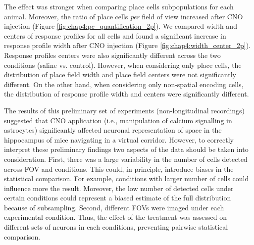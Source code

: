 The effect was stronger when comparing place cells subpopulations for each animal.
Moreover, the ratio of place cells \textit{per} field of view increased after CNO injection (Figure \ref{fig:chap4:pc_quantification_2p}). 
We compared width and centers of response profiles for all cells and found a significant increase in response profile width after CNO injection (Figure \ref{fig:chap4:width_center_2p}). 
Response profiles centers were also significantly different across the two conditions (saline vs. control). 
However, when considering only place cells, the distribution of place field width and place field centers were not significantly different. 
On the other hand, when considering only non-spatial encoding cells, the distribution of response profile width and centers were significantly different. 

The results of this preliminary set of experiments (non-longitudinal recordings) suggested that CNO application (i.e., manipulation of calcium signalling in astrocytes) significantly affected neuronal representation of space in the hippocampus of mice navigating in a virtual corridor. 
However, to correctly interpret these preliminary findings two aspects of the data should be taken into consideration. 
First, there was a large variability in the number of cells detected across FOV and conditions. 
This could, in principle, introduce biases in the statistical comparison. For example, conditions with larger number of cells could influence more the result. 
Moreover, the low number of detected cells under certain conditions could represent a biased estimate of the full distribution because of subsampling.
Second, different FOVs were imaged under each experimental condition.
Thus, the effect of the treatment was assessed on different sets of neurons in each conditions, preventing pairwise statistical comparison.


